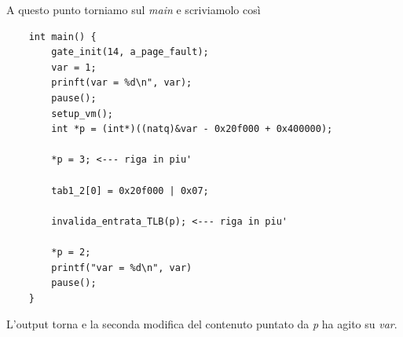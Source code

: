 A questo punto torniamo sul \emph{main} e scriviamolo così
\begin{verbatim}
	int main() {
		gate_init(14, a_page_fault);
		var = 1;
		prinft(var = %d\n", var);
		pause();
		setup_vm();
		int *p = (int*)((natq)&var - 0x20f000 + 0x400000);
		
		*p = 3; <--- riga in piu'
		
		tab1_2[0] = 0x20f000 | 0x07;
		
		invalida_entrata_TLB(p); <--- riga in piu'
		
		*p = 2;
		printf("var = %d\n", var)
		pause();
	}
\end{verbatim}
L'output torna e la seconda modifica del contenuto puntato da \emph{p} ha agito su \emph{var}.